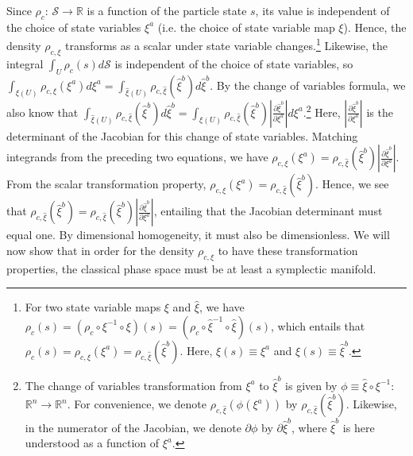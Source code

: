 \documentclass[12pt, english, twoside]{article} %
\begin{document}
Since $\rho_c$: $\mathcal{S} \to \mathbb{R}$ is a function of the particle state $s$, its value is independent of the choice of state variables $\xi^a$ (i.e. the choice of state variable map $\xi$). Hence, the density $\rho_{c, \xi}$ transforms as a scalar under state variable changes.\footnote{For two state variable maps $\xi$ and $\hat{\xi}$, we have $\rho_c(s) = (\rho_c \circ \xi^{-1} \circ \xi)(s) = (\rho_c \circ \hat{\xi}^{-1} \circ \hat{\xi})(s)$, which entails that $\rho_c(s) = \rho_{c, \xi} (\xi^a) = \rho_{c, \hat{\xi}} (\hat{\xi}^b)$. Here, $\xi(s) \equiv \xi^a$ and $\hat{\xi}(s) \equiv \hat{\xi}^b$.} Likewise, the integral $\int_U \rho_c(s) d\mathcal{S} $ is independent of the choice of state variables, so $\int_{\xi(U)} \rho_{c, \xi} (\xi^a) d \xi^a = \int_{\hat{\xi}(U)} \rho_{c, \hat{\xi}} (\hat{\xi}^b) d \hat{\xi}^b$. By the change of variables formula, we also know that $\int_{\hat{\xi}(U)} \rho_{c, \hat{\xi}} (\hat{\xi}^b) d \hat{\xi}^b= \int_{\xi(U)} \rho_{c, \hat{\xi}} (\hat{\xi}^b) \left|\frac{\partial \hat{\xi}^b}{\partial \xi^a} \right|  d \xi^a$.\footnote{The change of variables transformation from $\xi^a$ to $\hat{\xi}^b$ is given by $\phi \equiv \hat{\xi} \circ \xi^{-1}$: $\mathbb{R}^n \to \mathbb{R}^n $. For convenience, we denote $\rho_{c, \hat{\xi}} (\phi(\xi^a))$ by $\rho_{c, \hat{\xi}} (\hat{\xi}^b)$. Likewise, in the numerator of the Jacobian, we denote $\partial \phi$ by $\partial \hat{\xi}^b$, where $\hat{\xi}^b$ is here understood as a function of $\xi^a$.} Here, $ \left|\frac{\partial \hat{\xi}^b}{\partial \xi^a} \right|$ is the determinant of the Jacobian for this change of state variables. Matching integrands from the preceding two equations, we have $\rho_{c, \xi} (\xi^a) = \rho_{c, \hat{\xi}} (\hat{\xi}^b) \left|\frac{\partial \hat{\xi}^b}{\partial \xi^a} \right|$. From the scalar transformation property, $\rho_{c, \xi} (\xi^a) = \rho_{c, \hat{\xi}} (\hat{\xi}^b)$. Hence, we see that $\rho_{c, \hat{\xi}} (\hat{\xi}^b) =  \rho_{c, \hat{\xi}} (\hat{\xi}^b) \left|\frac{\partial \hat{\xi}^b}{\partial \xi^a} \right|$, entailing that the Jacobian determinant must equal one. By dimensional homogeneity, it must also be dimensionless. We will now show that in order for the density $\rho_{c, \xi}$ to have these transformation properties, the classical phase space must be at least a symplectic manifold. 
\end{document}
